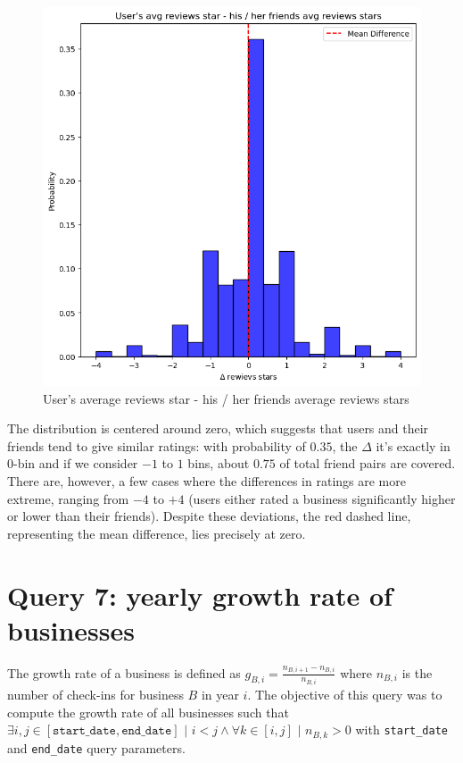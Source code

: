\documentclass{Configuration_Files/PoliMi3i_thesis}
\begin{document}
\begin{figure}[H]
    \centering
    \includegraphics[width=2\columnwidth / 3]{imgs/query_6.png}
    \caption{User's average reviews star - his / her friends average reviews stars}
    \label{fig:query_6}
\end{figure}

\bigskip

The distribution is centered around zero, which suggests that users and their friends tend to give similar ratings: with probability of $0.35$, the $\Delta$ it's exactly in $0$-bin and if we consider $-1$ to $1$ bins, about $0.75$ of total friend pairs are covered. There are, however, a few cases where the differences in ratings are more extreme, ranging from $-4$ to $+4$ (users either rated a business significantly higher or lower than their friends). Despite these deviations, the red dashed line, representing the mean difference, lies precisely at zero. 

\section{Query 7: yearly growth rate of businesses}
The growth rate of a business is defined as $g_{B, i}=\frac{n_{B, i + 1} - n_{B, i}}{n_{B, i}}$ where $n_{B, i}$ is the number of check-ins for business $B$ in year $i$. The objective of this query was to compute the growth rate of all businesses such that $\exists i, j \in [\texttt{start\_date}, \texttt{end\_date}] \,\, | \,\, i < j \land \forall k \in [i, j] \,\, | \,\, n_{B, k} > 0$ with \texttt{start\_date} and \texttt{end\_date} query parameters.
\end{document}
